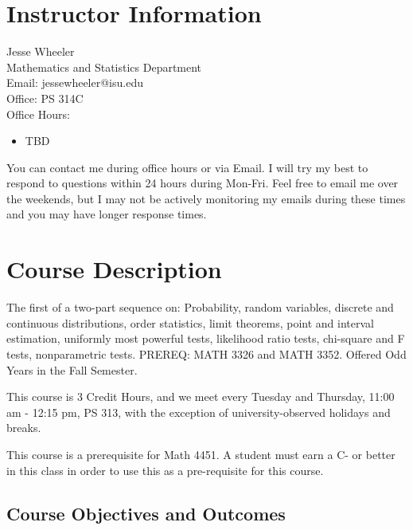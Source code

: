 \documentclass[11pt]{article}\usepackage[]{graphicx}\usepackage[]{xcolor}
\begin{document}
\section{Instructor Information}

Jesse Wheeler \\
Mathematics and Statistics Department \\
Email: jessewheeler@isu.edu\\
Office: PS 314C\\
Office Hours: 
\begin{itemize}
  \item TBD
\end{itemize}

You can contact me during office hours or via Email. 
I will try my best to respond to questions within 24 hours during Mon-Fri.
Feel free to email me over the weekends, but I may not be actively monitoring my emails during these times and you may have longer response times.

\section{Course Description}

The first of a two-part sequence on:
Probability, random variables, discrete and continuous distributions, order statistics, limit theorems, point and interval estimation, uniformly most powerful tests, likelihood ratio tests, chi-square and F tests, nonparametric tests. 
PREREQ: MATH 3326 and MATH 3352. Offered Odd Years in the Fall Semester.

This course is 3 Credit Hours, and we meet every Tuesday and Thursday, 11:00 am - 12:15 pm, PS 313, with the exception of university-observed holidays and breaks.

This course is a prerequisite for Math 4451. A student must earn a C- or better in this class in order to use this as a pre-requisite for this course.

\subsection{Course Objectives and Outcomes}
\end{document}
